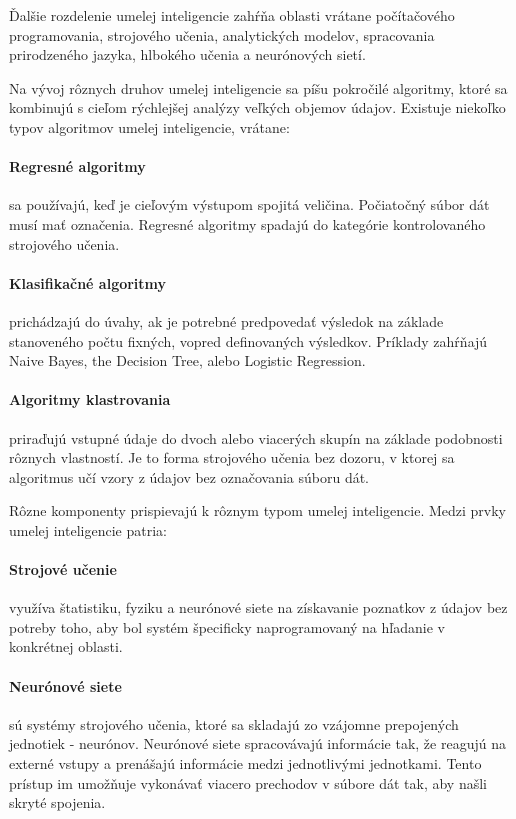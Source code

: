 Ďalšie rozdelenie umelej inteligencie zahŕňa oblasti vrátane počítačového programovania, strojového učenia, analytických modelov, spracovania prirodzeného jazyka, hlbokého učenia a neurónových sietí.

Na vývoj rôznych druhov umelej inteligencie sa píšu pokročilé algoritmy, ktoré sa kombinujú s cieľom rýchlejšej analýzy veľkých objemov údajov. Existuje niekoľko typov algoritmov umelej inteligencie, vrátane:
\paragraph{Regresné algoritmy} sa používajú, keď je cieľovým výstupom spojitá veličina. Počiatočný súbor dát musí mať označenia. Regresné algoritmy spadajú do kategórie kontrolovaného strojového učenia.

\paragraph{Klasifikačné algoritmy} prichádzajú do úvahy, ak je potrebné predpovedať výsledok na základe stanoveného počtu fixných, vopred definovaných výsledkov. Príklady zahŕňajú Naive Bayes, the Decision Tree, alebo Logistic Regression.

\paragraph{Algoritmy klastrovania} priraďujú vstupné údaje do dvoch alebo viacerých skupín na základe podobnosti rôznych vlastností. Je to forma strojového učenia bez dozoru, v ktorej sa algoritmus učí vzory z údajov bez označovania súboru dát.

Rôzne komponenty prispievajú k rôznym typom umelej inteligencie. Medzi prvky umelej inteligencie patria:
\paragraph{Strojové učenie} využíva štatistiku, fyziku a neurónové siete na získavanie poznatkov z údajov bez potreby toho, aby bol systém špecificky naprogramovaný na hľadanie v konkrétnej oblasti.

\paragraph{Neurónové siete} sú systémy strojového učenia, ktoré sa skladajú zo vzájomne prepojených jednotiek - neurónov. Neurónové siete spracovávajú informácie tak, že reagujú na externé vstupy a prenášajú informácie medzi jednotlivými jednotkami. Tento prístup im umožňuje vykonávať viacero prechodov v súbore dát tak, aby našli skryté spojenia.

